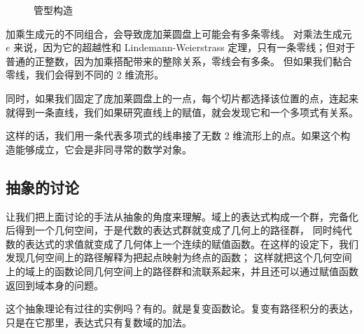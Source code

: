 \documentclass[a4paper,12pt]{article}
\numberwithin{problem}{section}
\numberwithin{definition}{section}
\numberwithin{lemma}{section}
\numberwithin{proposition}{section}
\numberwithin{theorem}{section}
\numberwithin{grammar}{section}
\numberwithin{program}{section}
\numberwithin{convention}{section}
\numberwithin{corollary}{section}
\begin{document}
\begin{figure}[ht]
    \centering
    \caption{管型构造}\label{fig:tube}
\end{figure}

加乘生成元的不同组合，会导致庞加莱圆盘上可能会有多条零线。
对乘法生成元 $e$ 来说，因为它的超越性和 Lindemann-Weierstrass 定理，只有一条零线；但对于普通的正整数，因为加乘搭配带来的整除关系，零线会有多条。
但如果我们黏合零线，我们会得到不同的 2 维流形。

同时，如果我们固定了庞加莱圆盘上的一点，每个切片都选择该位置的点，连起来就得到一条直线，我们如果研究直线上的赋值，就会发现它和一个多项式有关系。

这样的话，我们用一条代表多项式的线串接了无数 2 维流形上的点。如果这个构造能够成立，它会是非同寻常的数学对象。

\subsection{抽象的讨论}

让我们把上面讨论的手法从抽象的角度来理解。域上的表达式构成一个群，完备化后得到一个几何空间，于是代数的表达式群就变成了几何上的路径群，
同时纯代数的表达式的求值就变成了几何体上一个连续的赋值函数。在这样的设定下，我们发现几何空间上的路径解释为把起点映射为终点的函数；
这样就把这个几何空间上的域上的函数论同几何空间上的路径群和流联系起来，并且还可以通过赋值函数返回到域本身的问题。

这个抽象理论有过往的实例吗？有的。就是复变函数论。复变有路径积分的表达，只是在它那里，表达式只有复数域的加法。
\end{document}
